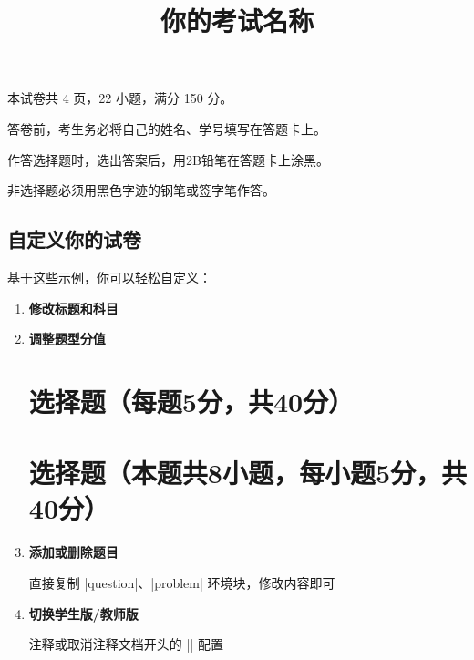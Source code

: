 \begin{latexcode}
  \secret


  \begin{notice}
    \item 本试卷共 4 页，22 小题，满分 150 分。
    \item 答卷前，考生务必将自己的姓名、学号填写在答题卡上。
    \item 作答选择题时，选出答案后，用2B铅笔在答题卡上涂黑。
    \item 非选择题必须用黑色字迹的钢笔或签字笔作答。
  \end{notice}

\end{latexcode}

\subsection{自定义你的试卷}

基于这些示例，你可以轻松自定义：

\begin{enumerate}
  \item \textbf{修改标题和科目}
    \begin{latexcode}
      \title{你的考试名称}
      \subject{你的科目}
    \end{latexcode}

  \item \textbf{调整题型分值}
    \begin{latexcode}
      \section{选择题（每题5分，共40分）}
      \section{选择题（本题共8小题，每小题5分，共40分）}
    \end{latexcode}

  \item \textbf{添加或删除题目}

    直接复制 |question|、|problem| 环境块，修改内容即可

  \item \textbf{切换学生版/教师版}

    注释或取消注释文档开头的 |\examsetup| 配置
\end{enumerate}

